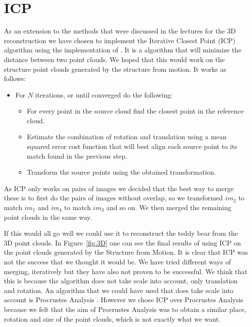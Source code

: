\section{ICP}
\label{ICP}
As an extension to the methods that were discussed in the lectures for the 3D reconstruction we have chosen to implement the Iterative Closest Point (ICP) algorithm using the implementation of \cite{ICP}. It is a algorithm that will minimize the distance between two point clouds. We hoped that this would work on the structure point clouds generated by the structure from motion. It works as follows:

\begin{itemize}
	\item For $N$ iterations, or until converged do the following:
	\begin{itemize}
		\item For every point in the source cloud find the closest point in the reference cloud.
		\item Estimate the combination of rotation and translation using a mean squared error cost function that will best align each source point to its match found in the previous step.
		\item Transform the source points using the obtained transformation.
	\end{itemize}
\end{itemize}

As ICP only works on pairs of images we decided that the best way to merge these is to first do the pairs of images without overlap, so we transformed $im_2$ to match $im_1$ and $im_4$ to match $im_3$ and so on. We then merged the remaining point clouds in the same way.

If this would all go well we could use it to reconstruct the teddy bear from the 3D point clouds. In Figure~\ref{fig:3D} one can see the final results of using ICP on the point clouds generated by the Structure from Motion. It is clear that ICP was not the success that we thought it would be. We have tried different ways of merging, iteratively but they have also not proven to be successful. We think that this is because the algorithm does not take scale into account, only translation and rotation. An algorithm that we could have used that does take scale into account is Procrustes Analysis \cite{procrustes}. However we chose ICP over Procrustes Analysis because we felt that the aim of Procrustes Analysis was to obtain a similar place, rotation and size of the point clouds, which is not exactly what we want.

